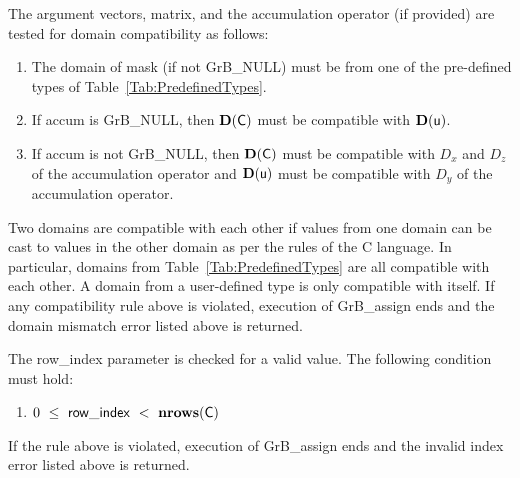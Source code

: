 The argument vectors, matrix, and the accumulation 
operator (if provided) are tested for domain compatibility as follows:
\begin{enumerate}
	\item The domain of {\sf mask} (if not {\sf GrB\_NULL}) must be from one of 
    the pre-defined types of Table~\ref{Tab:PredefinedTypes}.

	\item If {\sf accum} is {\sf GrB\_NULL}, then $\bold{D}({\sf C})$ must be 
    compatible with $\bold{D}({\sf u})$.

	\item If {\sf accum} is not {\sf GrB\_NULL}, then $\bold{D}({\sf C})$ must be
    compatible with $D_x$ and $D_z$ of the accumulation operator and 
    $\bold{D}({\sf u})$ must be compatible with $D_y$ of the accumulation operator.
\end{enumerate}
Two domains are compatible with each other if values from one domain can be cast 
to values in the other domain as per the rules of the C language.
In particular, domains from Table~\ref{Tab:PredefinedTypes} are all compatible 
with each other. A domain from a user-defined type is only compatible with itself.
If any compatibility rule above is violated, execution of {\sf GrB\_assign} ends
and the domain mismatch error listed above is returned.

The {\sf row\_index} parameter is checked for a valid value.  The following
condition must hold:
\begin{enumerate}
	\item $0\ \leq\ {\sf row\_index} \ <\ \bold{nrows}({\sf C})$
\end{enumerate}
If the rule above is violated, execution of {\sf GrB\_assign} ends 
and the invalid index error listed above is returned.

